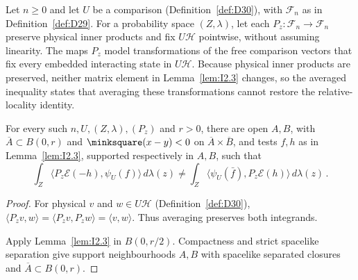 Let $n\ge0$ and let $U$ be a comparison (Definition~\ref{def:D30}), with $\mathcal F_n$ as in Definition~\ref{def:D29}. For a probability space $(Z,\lambda)$, let each $P_z:\mathcal F_n\to\mathcal F_n$ preserve physical inner products and fix $U\mathcal H$ pointwise, without assuming linearity.
The maps $P_z$ model transformations of the free comparison vectors that fix every embedded interacting state in $U\mathcal H$. Because physical inner products are preserved, neither matrix element in Lemma~\ref{lem:I2.3} changes, so the averaged inequality states that averaging these transformations cannot restore the relative-locality identity.
\begin{lemma}\label{lem:I2.4}
For every such $n,U,(Z,\lambda),(P_z)$ and $r>0$, there are open $A,B$, with $\overline A\subset B(0,r)$ and $\minksquare(x-y)<0$ on $\overline A\times\overline B$, and tests $f,h$ as in Lemma~\ref{lem:I2.3}, supported respectively in $A,B$, such that
\begin{equation*}
\int_Z\langle P_z\mathcal E(-h),\psi_U(f)\rangle\,d\lambda(z)
\ne\int_Z\langle\psi_U(\bar f),P_z\mathcal E(h)\rangle\,d\lambda(z)\,.
\end{equation*}
\end{lemma}
\begin{proof}
For physical $v$ and $w\in U\mathcal H$ (Definition~\ref{def:D30}), $\langle P_zv,w\rangle=\langle P_zv,P_zw\rangle=\langle v,w\rangle$.
Thus averaging preserves both integrands.

Apply Lemma~\ref{lem:I2.3} in $B(0,r/2)$. Compactness and strict spacelike separation give support neighbourhoods $A,B$ with spacelike separated closures and $\overline A\subset B(0,r)$.
\end{proof}
